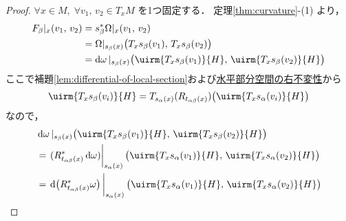 \documentclass[TQFT_main]{subfiles}
\begin{document}
\begin{proof}
    $\forall x \in M,\; \forall v_1,\, v_2 \in T_x M$ を1つ固定する．
    定理\ref{thm:curvature}-(1) より，
    \begin{align}
        F_\beta|_x (v_1,\, v_2)
        &= s_\beta^* \Omega|_x(v_1,\, v_2) \\
        &= \Omega|_{s_\beta(x)} \bigl( T_x s_\beta(v_1),\, T_x s_\beta(v_2) \bigr) \\
        &= \dd{\omega}|_{s_\beta(x)} \bigl( \uirm{T_x s_\beta(v_1)}{H},\, \uirm{T_x s_\beta(v_2)}{H} \bigr)
    \end{align}
    ここで補題\ref{lem:differential-of-local-section}および\hyperref[def:connection]{水平部分空間の右不変性}から
    \begin{align}
        \uirm{T_x s_\beta(v_i)}{H} = T_{s_\alpha(x)}(R_{t_{\alpha\beta}(x)}) \bigl( \uirm{T_x s_\alpha(v_i)}{H}\bigr)
    \end{align}
    なので，
    \begin{align}
        &\dd{\omega}|_{s_\beta(x)} \bigl( \uirm{T_x s_\beta(v_1)}{H},\, \uirm{T_x s_\beta(v_2)}{H} \bigr) \\
        &= \eval{(R_{t_{\alpha\beta}(x)}^*\dd{\omega})}_{s_\alpha(x)} \bigl( \uirm{T_x s_\alpha(v_1)}{H},\, \uirm{T_x s_\alpha(v_2)}{H} \bigr) \\
        &= \eval{\dd{\bigl(R_{t_{\alpha\beta}(x)}^*\omega\bigr)}}_{s_\alpha(x)} \bigl( \uirm{T_x s_\alpha(v_1)}{H},\, \uirm{T_x s_\alpha(v_2)}{H} \bigr) \\

\end{align}
\end{proof}
\end{document}
